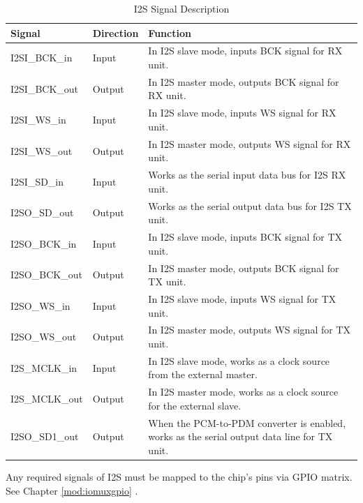 \documentclass[main\_\_EN.tex]{subfiles}
\begin{document}
\begin{table}[H]
    \centering
    \caption{I2S Signal Description}
    \label{tab:i2s-signal-descr}
    \begin{threeparttable}
    \begin{tabular}{|p{2.5cm}|p{1.8cm}|p{10.5cm}| }
    \hline
    \rowcolor{lightgray}
    \textbf{Signal} & \textbf{Direction} & \textbf{Function} \\
    \hline
    I2SI\_BCK\_in  & Input & In I2S slave mode, inputs BCK signal for RX unit. \\
    \hline
    I2SI\_BCK\_out& Output & In I2S master mode, outputs BCK signal for RX unit. \\
    \hline
    I2SI\_WS\_in & Input & In I2S slave mode, inputs WS signal for RX unit. \\
    \hline
    I2SI\_WS\_out& Output & In I2S master mode, outputs WS signal for RX unit. \\\hline
    I2SI\_SD\_in& Input & Works as the serial input data bus for I2S RX unit.\\\hline
    I2SO\_SD\_out& Output & Works as the serial output data bus for I2S TX unit.\\\hline
    I2SO\_BCK\_in&  Input & In I2S slave mode, inputs BCK signal for TX unit. \\\hline
    I2SO\_BCK\_out&  Output & In I2S master mode, outputs BCK signal for TX unit. \\\hline
    I2SO\_WS\_in&  Input & In I2S slave mode, inputs WS signal for TX unit. \\\hline
    I2SO\_WS\_out& Output & In I2S master mode, outputs WS signal for TX unit. \\\hline
    I2S\_MCLK\_in& Input & In I2S slave mode, works as a clock source from the external master.\\\hline
    I2S\_MCLK\_out& Output & In I2S master mode, works as a clock source for the external slave. \\\hline
    I2SO\_SD1\_out& Output & When the PCM-to-PDM converter is enabled, works as the serial output data line for TX unit. \\\hline
    \end{tabular}
    \begin{tablenotes}
        \item[*] Any required signals of I2S must be mapped to the chip's pins via GPIO matrix. See Chapter \ref{mod:iomuxgpio} \textit{}.
    \end{tablenotes}
    \end{threeparttable}
\end{table}
\end{document}
